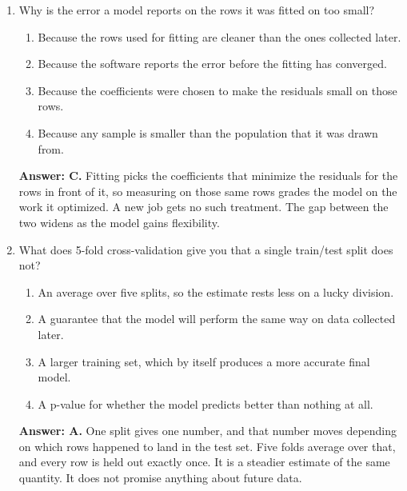 \documentclass[11pt]{article}
\begin{document}
\begin{enumerate}[itemsep=14pt]
\vspace{2pt}
\textbf{Answer: C.} More data pins down where the line sits, so the confidence interval keeps narrowing. The prediction interval also contains the spread of individual jobs around the line, which more data does not remove. It narrows a little and then levels off near that spread.
\vspace{4pt}

\item Why is the error a model reports on the rows it was fitted on too small?

\begin{enumerate}[label=\Alph*., itemsep=1pt, topsep=3pt]
  \item Because the rows used for fitting are cleaner than the ones collected later.
  \item Because the software reports the error before the fitting has converged.
  \item Because the coefficients were chosen to make the residuals small on those rows.
  \item Because any sample is smaller than the population that it was drawn from.
\end{enumerate}

\vspace{2pt}
\textbf{Answer: C.} Fitting picks the coefficients that minimize the residuals for the rows in front of it, so measuring on those same rows grades the model on the work it optimized. A new job gets no such treatment. The gap between the two widens as the model gains flexibility.
\vspace{4pt}

\item What does 5-fold cross-validation give you that a single train/test split does not?

\begin{enumerate}[label=\Alph*., itemsep=1pt, topsep=3pt]
  \item An average over five splits, so the estimate rests less on a lucky division.
  \item A guarantee that the model will perform the same way on data collected later.
  \item A larger training set, which by itself produces a more accurate final model.
  \item A p-value for whether the model predicts better than nothing at all.
\end{enumerate}

\vspace{2pt}
\textbf{Answer: A.} One split gives one number, and that number moves depending on which rows happened to land in the test set. Five folds average over that, and every row is held out exactly once. It is a steadier estimate of the same quantity. It does not promise anything about future data.
\vspace{4pt}


\end{enumerate}
\end{document}
